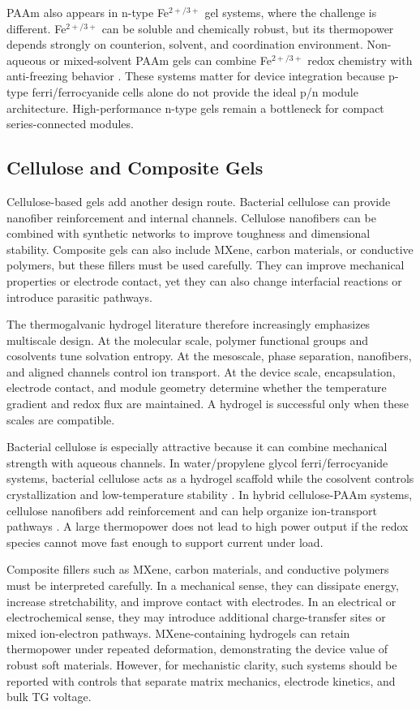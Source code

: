 \documentclass[a4paper,12pt]{report}
\begin{document}
PAAm also appears in n-type Fe$^{2+/3+}$ gel systems, where the challenge is
different. Fe$^{2+/3+}$ can be soluble and chemically robust, but its
thermopower depends strongly on counterion, solvent, and coordination
environment. Non-aqueous or mixed-solvent PAAm gels can combine Fe$^{2+/3+}$
redox chemistry with anti-freezing behavior \citep{liu2024subzero}. These systems matter for device
integration because p-type ferri/ferrocyanide cells alone do not provide the
ideal p/n module architecture. High-performance n-type gels remain a bottleneck
for compact series-connected modules.

\subsection{Cellulose and Composite Gels}

Cellulose-based gels add another design route. Bacterial cellulose can provide
nanofiber reinforcement and internal channels. Cellulose nanofibers can be
combined with synthetic networks to improve toughness and dimensional stability.
Composite gels can also include MXene, carbon materials, or conductive
polymers, but these fillers must be used carefully. They can improve mechanical
properties or electrode contact, yet they can also change interfacial reactions
or introduce parasitic pathways.

The thermogalvanic hydrogel literature therefore increasingly emphasizes
multiscale design. At the molecular scale, polymer functional groups and
cosolvents tune solvation entropy. At the mesoscale, phase separation,
nanofibers, and aligned channels control ion transport. At the device scale,
encapsulation, electrode contact, and module geometry determine whether the
temperature gradient and redox flux are maintained. A hydrogel is successful
only when these scales are compatible.

Bacterial cellulose is especially attractive because it can combine mechanical
strength with aqueous channels. In water/propylene glycol ferri/ferrocyanide
systems, bacterial cellulose acts as a hydrogel scaffold while the cosolvent
controls crystallization and low-temperature stability \citep{yin2023bacterial}.
In hybrid cellulose-PAAm systems, cellulose nanofibers add reinforcement and can
help organize ion-transport pathways \citep{lin2024triple}.
A large thermopower does not lead to high power output if the redox species
cannot move fast enough to support current under load.

Composite fillers such as MXene, carbon materials, and conductive polymers must
be interpreted carefully. In a mechanical sense, they can dissipate energy,
increase stretchability, and improve contact with electrodes. In an electrical
or electrochemical sense, they may introduce additional charge-transfer sites or
mixed ion-electron pathways. MXene-containing hydrogels can retain thermopower
under repeated deformation, demonstrating the device value of robust soft
materials. However, for mechanistic clarity, such systems should
be reported with controls that separate matrix mechanics, electrode kinetics,
and bulk TG voltage.
\end{document}
